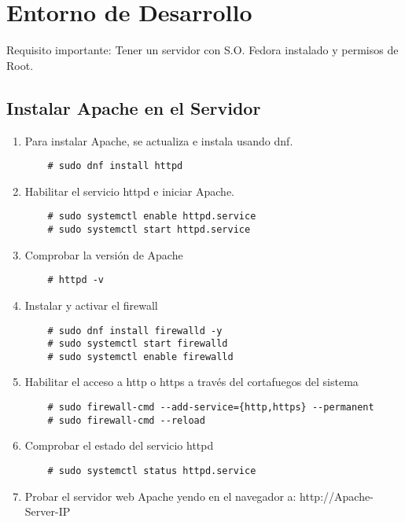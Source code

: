 \section{Entorno de Desarrollo}

Requisito importante: Tener un servidor con S.O. Fedora instalado y permisos de Root. \\

\subsection{Instalar Apache en el Servidor}
\begin{enumerate}
    \item Para instalar Apache, se actualiza e instala usando dnf.
    \begin{lstlisting} 
    # sudo dnf install httpd
    \end{lstlisting}
    \item Habilitar el servicio httpd e iniciar Apache.
    \begin{lstlisting} 
    # sudo systemctl enable httpd.service
    # sudo systemctl start httpd.service
    \end{lstlisting}
    \item Comprobar la versión de Apache
    \begin{lstlisting}
    # httpd -v
    \end{lstlisting}
    \item Instalar y activar el firewall
    \begin{lstlisting}
    # sudo dnf install firewalld -y
    # sudo systemctl start firewalld
    # sudo systemctl enable firewalld
    \end{lstlisting}
    \item Habilitar el acceso a http o https a través del cortafuegos del sistema
    \begin{lstlisting}
    # sudo firewall-cmd --add-service={http,https} --permanent
    # sudo firewall-cmd --reload
    \end{lstlisting}
    \item Comprobar el estado del servicio httpd
    \begin{lstlisting}
    # sudo systemctl status httpd.service
    \end{lstlisting}
    \item Probar el servidor web Apache yendo en el navegador a: http://Apache-Server-IP
\end{enumerate}


